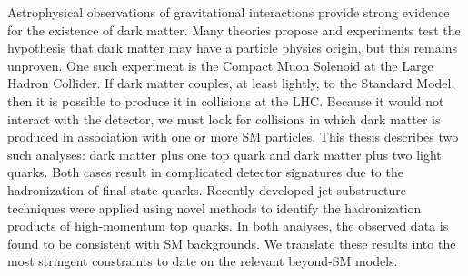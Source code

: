 % 
% 
%

Astrophysical observations of gravitational interactions provide strong evidence for the existence of dark matter. 
Many theories propose and experiments test the hypothesis that dark matter may have a particle physics origin, but this remains unproven. 
One such experiment is the Compact Muon Solenoid at the Large Hadron Collider. 
If dark matter couples, at least lightly, to the Standard Model, then it is possible to produce it in collisions at the LHC.
Because it would not interact with the detector, we must look for collisions in which dark matter is produced in association with one or more SM particles. 
This thesis describes two such analyses: dark matter plus one top quark and dark matter plus two light quarks.
Both cases result in complicated detector signatures due to the hadronization of final-state quarks. 
Recently developed jet substructure techniques were applied using novel methods to identify the hadronization products of high-momentum top quarks.
In both analyses, the observed data is found to be consistent with SM backgrounds.
We translate these results into the most stringent constraints to date on the relevant beyond-SM models.
